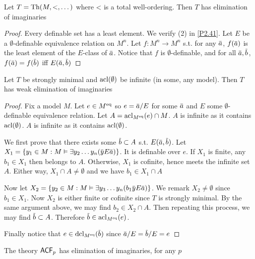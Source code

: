 \documentclass[11pt]{article}
\begin{document}
\begin{examplle}[]
Let \(T=\operatorname{Th}(M,<,\dots)\) where < is a total well-ordering. Then \(T\) has elimination of imaginaries
\end{examplle}

\begin{proof}
Every definable set has a least element. We verify (2) in \ref{P2.41}. Let \(E\) be
a \(\emptyset\)-definable equivalence relation on \(M^n\). Let \(f:M^n\to M^n\) s.t. for
any \(\bara\), \(f(\bara)\) is the least element of the \(E\)-class of \(\bara\). Notice
that \(f\) is \(\emptyset\)-definable, and for all \(\bara,\barb\), \(f(\bara)=f(\barb)\)
iff \(E(\bara,\barb)\)
\end{proof}

\begin{lemma}[]
\label{P2.49}
Let \(T\) be strongly minimal and \(\operatorname{acl}(\emptyset)\) be infinite (in some, any model). Then \(T\) has
weak elimination of imaginaries
\end{lemma}

\begin{proof}
Fix a model \(M\). Let \(e\in M^{\operatorname{eq}}\)
so \(e=\bara/E\) for some \(\bara\) and \(E\) some \(\emptyset\)-definable equivalence relation.
Let \(A=\operatorname{acl}_{M^{\operatorname{eq}}}(e)\cap M\). \(A\) is infinite as it contains \(\operatorname{acl}(\emptyset)\). \(A\) is infinite
as it contains \(\operatorname{acl}(\emptyset)\).

We first prove that there exists some \(\barb\subset A\) s.t. \(E(\bara,\barb)\).
Let \(X_1=\{y_1\in M:M\vDash\exists y_2\dots y_n(\bary E\bara)\}\). It is definable over \(e\). If \(X_1\) is finite,
any \(b_1\in X_1\) then belongs to \(A\). Otherwise, \(X_1\) is cofinite, hence meets the infinite
set \(A\). Either way, \(X_1\cap A\neq\emptyset\) and we have \(b_1\in X_1\cap A\)

Now let \(X_2=\{y_2\in M:M\vDash\exists y_3\dots y_n(b_1\bary E\bara)\}\). We remark \(X_2\neq\emptyset\) since \(b_1\in X_1\).
Now \(X_2\) is either finite or cofinite since \(T\) is strongly minimal. By the same argument
above, we may find \(b_2\in X_2\cap A\). Then repeating this process, we may find \(\barb\subset A\).
Therefore \(\barb\in\acl_{M^{\eq}}(e)\).

Finally notice that \(e\in\dcl_{M^{\eq}}(\barb)\) since \(\bara/E=\barb/E=e\)
\end{proof}

\begin{examplle}[]
The theory \(\textsf{ACF}_p\) has elimination of imaginaries, for any \(p\)
\end{examplle}
\end{document}
